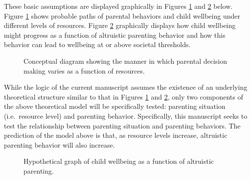 \documentclass[review]{elsarticle}\usepackage[]{graphicx}\usepackage[]{color}
\begin{document}
These basic assumptions are displayed graphically in Figures \ref{fig:fig1} and \ref{fig:fig2}
below. Figure \ref{fig:fig1} shows probable paths of parental behaviors and child
wellbeing under different levels of resources. Figure \ref{fig:fig2} graphically
displays how child wellbeing might progress as a function of altruistic
parenting behavior and how this behavior can lead to wellbeing at or
above societal thresholds.
\FloatBarrier
\begin{figure}[htp] 
\caption{Conceptual diagram showing the manner in which parental decision making varies as a function of resources.}
\label{fig:fig1}
\end{figure}  
\FloatBarrier
While the logic of the current manuscript assumes the existence of an
underlying theoretical structure similar to that in Figures \ref{fig:fig1} and \ref{fig:fig2},
only two components of the above theoretical model will be specifically
tested: parenting situation (i.e.~resource level) and parenting
behavior. Specifically, this manuscript seeks to test the relationship
between parenting situation and parenting behaviors. The prediction of
the model above is that, as resource levels increase, altruistic
parenting behavior will also increase.
\FloatBarrier
\begin{figure}[htp] 
\caption{Hypothetical graph of child wellbeing as a function of altruistic parenting.}
\label{fig:fig2}
\end{figure}  
\FloatBarrier
\end{document}
